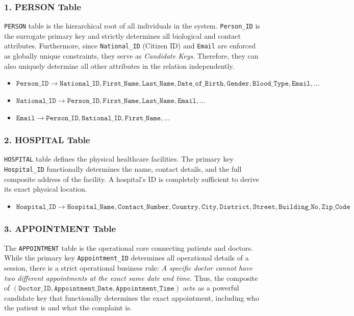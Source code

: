 \documentclass[12pt,a4paper]{article}
\begin{document}
\subsubsection*{1. PERSON Table}
\texttt{PERSON} table is the hierarchical root of all individuals in the system. \texttt{Person\_ID} is the surrogate primary key and strictly determines all biological and contact attributes. Furthermore, since \texttt{National\_ID} (Citizen ID) and \texttt{Email} are enforced as globally unique constraints, they serve as \textit{Candidate Keys}. Therefore, they can also uniquely determine all other attributes in the relation independently.

\begin{itemize}[label=$\bullet$]
	\item $ \texttt{Person\_ID} \rightarrow \texttt{National\_ID}, \texttt{First\_Name}, \texttt{Last\_Name}, \texttt{Date\_of\_Birth}, \texttt{Gender}, \texttt{Blood\_Type}, \texttt{Email}, \dots $
	\item $ \texttt{National\_ID} \rightarrow \texttt{Person\_ID}, \texttt{First\_Name}, \texttt{Last\_Name}, \texttt{Email}, \dots $
	\item $ \texttt{Email} \rightarrow \texttt{Person\_ID}, \texttt{National\_ID}, \texttt{First\_Name}, \dots $
\end{itemize}

\subsubsection*{2. HOSPITAL Table}
\texttt{HOSPITAL} table defines the physical healthcare facilities. The primary key \texttt{Hospital\_ID} functionally determines the name, contact details, and the full composite address of the facility. A hospital's ID is completely sufficient to derive its exact physical location.

\begin{itemize}[label=$\bullet$]
	\item $ \texttt{Hospital\_ID} \rightarrow \texttt{Hospital\_Name}, \texttt{Contact\_Number}, \texttt{Country}, \texttt{City}, \texttt{District}, \texttt{Street}, \texttt{Building\_No}, \texttt{Zip\_Code} $
\end{itemize}

\subsubsection*{3. APPOINTMENT Table}
The \texttt{APPOINTMENT} table is the operational core connecting patients and doctors. While the primary key \texttt{Appointment\_ID} determines all operational details of a session, there is a strict operational business rule: \textit{A specific doctor cannot have two different appointments at the exact same date and time}. Thus, the composite of $(\texttt{Doctor\_ID}, \texttt{Appointment\_Date}, \texttt{Appointment\_Time})$ acts as a powerful candidate key that functionally determines the exact appointment, including who the patient is and what the complaint is.
\end{document}
